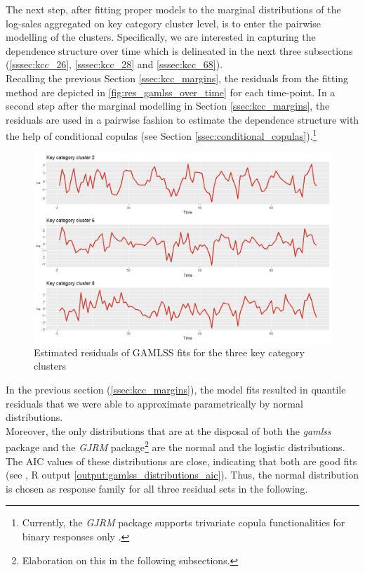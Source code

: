 
The next step, after fitting proper models to the marginal distributions of the log-sales aggregated on key category cluster level, is to enter the pairwise modelling of the clusters. Specifically, we are interested in capturing the dependence structure over time which is delineated in the next three subsections (\ref{sssec:kcc_26}, \ref{sssec:kcc_28} and \ref{sssec:kcc_68}).
\\

Recalling the previous Section \ref{ssec:kcc_margins}, the residuals from the fitting method are depicted in \autoref{fig:res_gamlss_over_time} for each time-point. In a second step after the marginal modelling in Section \ref{ssec:kcc_margins}, the residuals are used in a pairwise fashion to estimate the dependence structure with the help of conditional copulas (see Section \ref{ssec:conditional_copulas}).\footnote{Currently, the \textit{GJRM} package supports trivariate copula functionalities for binary responses only \citep{marragjrm}.}
\\

\begin{figure}[H]
\centering
  \includegraphics[width=0.95\linewidth]{figures/res_gamlss_over_time.png}
  \caption{Estimated residuals of GAMLSS fits for the three key category clusters}
  \label{fig:res_gamlss_over_time}
\end{figure}










In the previous section (\ref{ssec:kcc_margins}), the model fits resulted in quantile residuals that we were able to approximate parametrically by normal distributions. \\
Moreover, the only distributions that are at the disposal of both the \textit{gamlss} package \citep{rigby2005generalized} and the \textit{GJRM} package\footnote{Elaboration on this in the following subsections.} \citep{marragjrm} are the normal and the logistic distributions. The \ac{AIC} values of these distributions are close, indicating that both are good fits (see , R output \ref{output:gamlss_distributions_aic}). Thus, the normal distribution is chosen as response family for all three residual sets in the following.


